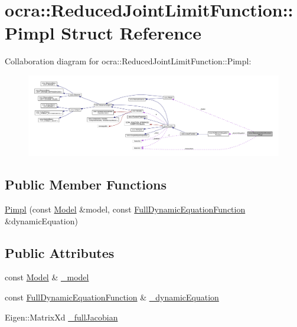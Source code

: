 \hypertarget{structReducedJointLimitFunction_1_1Pimpl}{}\section{ocra\+:\+:Reduced\+Joint\+Limit\+Function\+:\+:Pimpl Struct Reference}
\label{structReducedJointLimitFunction_1_1Pimpl}


Collaboration diagram for ocra\+:\+:Reduced\+Joint\+Limit\+Function\+:\+:Pimpl\+:\nopagebreak
\begin{figure}[H]
\begin{center}
\leavevmode
\includegraphics[width=350pt]{d0/d8b/structReducedJointLimitFunction_1_1Pimpl__coll__graph}
\end{center}
\end{figure}
\subsection*{Public Member Functions}
\begin{DoxyCompactItemize}
\item 
\hyperlink{structReducedJointLimitFunction_1_1Pimpl_a144b5331a7812ad5859215d57f8fd250}{Pimpl} (const \hyperlink{classocra_1_1Model}{Model} \&model, const \hyperlink{classocra_1_1FullDynamicEquationFunction}{Full\+Dynamic\+Equation\+Function} \&dynamic\+Equation)
\end{DoxyCompactItemize}
\subsection*{Public Attributes}
\begin{DoxyCompactItemize}
\item 
const \hyperlink{classocra_1_1Model}{Model} \& \hyperlink{structReducedJointLimitFunction_1_1Pimpl_abe6f625fec9bf8cff9f847bde9eb9ee2}{\+\_\+model}
\item 
const \hyperlink{classocra_1_1FullDynamicEquationFunction}{Full\+Dynamic\+Equation\+Function} \& \hyperlink{structReducedJointLimitFunction_1_1Pimpl_ad483380d3fcdd2da03a85d22947cf31d}{\+\_\+dynamic\+Equation}
\item 
Eigen\+::\+Matrix\+Xd \hyperlink{structReducedJointLimitFunction_1_1Pimpl_ae45e80b72fb13b54452c6ce9fe9e3798}{\+\_\+full\+Jacobian}
\end{DoxyCompactItemize}


